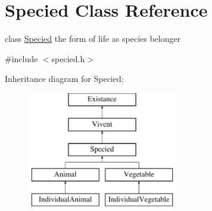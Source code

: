 \hypertarget{classSpecied}{
\section{Specied Class Reference}
\label{classSpecied}
}


class \hyperlink{classSpecied}{Specied} the form of life as species belonger  




{\ttfamily \#include $<$specied.h$>$}

Inheritance diagram for Specied:\begin{figure}[H]
\begin{center}
\leavevmode
\includegraphics[height=5.000000cm]{classSpecied}
\end{center}
\end{figure}
